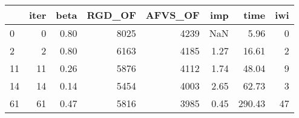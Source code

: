 \begin{tabular}{lrrrrrrr}
\toprule
{} &  iter &  beta &  RGD\_OF &  AFVS\_OF &  imp &   time &  iwi \\
\midrule
0  &     0 &  0.80 &    8025 &     4239 &  NaN &   5.96 &    0 \\
2  &     2 &  0.80 &    6163 &     4185 & 1.27 &  16.61 &    2 \\
11 &    11 &  0.26 &    5876 &     4112 & 1.74 &  48.04 &    9 \\
14 &    14 &  0.14 &    5454 &     4003 & 2.65 &  62.73 &    3 \\
61 &    61 &  0.47 &    5816 &     3985 & 0.45 & 290.43 &   47 \\
\bottomrule
\end{tabular}
